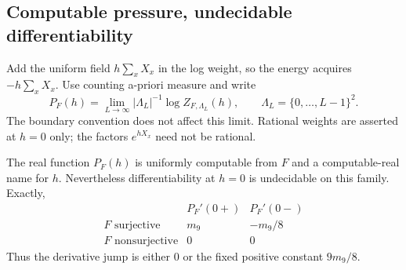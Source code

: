 \subsection{Computable pressure, undecidable differentiability}\label{sec:potts-pressure}
Add the uniform field $h\sum_xX_x$ in the log weight, so the energy acquires $-h\sum_xX_x$. Use counting a-priori measure and write
\[
 P_F(h)=\lim_{L\to\infty}|\Lambda_L|^{-1}\log Z_{F,\Lambda_L}(h),
 \qquad \Lambda_L=\{0,\ldots,L-1\}^2.
\]
The boundary convention does not affect this limit. Rational weights are asserted at $h=0$ only; the factors $e^{hX_x}$ need not be rational.

\begin{corollary}\label{cor:potts-pressure}
The real function $P_F(h)$ is uniformly computable from $F$ and a computable-real name for $h$. Nevertheless differentiability at $h=0$ is undecidable on this family. Exactly,
\begin{equation}\label{eq:potts-derivatives}
 \begin{array}{c|cc}
 &P_F'(0+)&P_F'(0-)\\\hline
 F\text{ surjective}&m_9&-m_9/8\\
 F\text{ nonsurjective}&0&0
 \end{array}
\end{equation}
Thus the derivative jump is either $0$ or the fixed positive constant $9m_9/8$.
\end{corollary}
